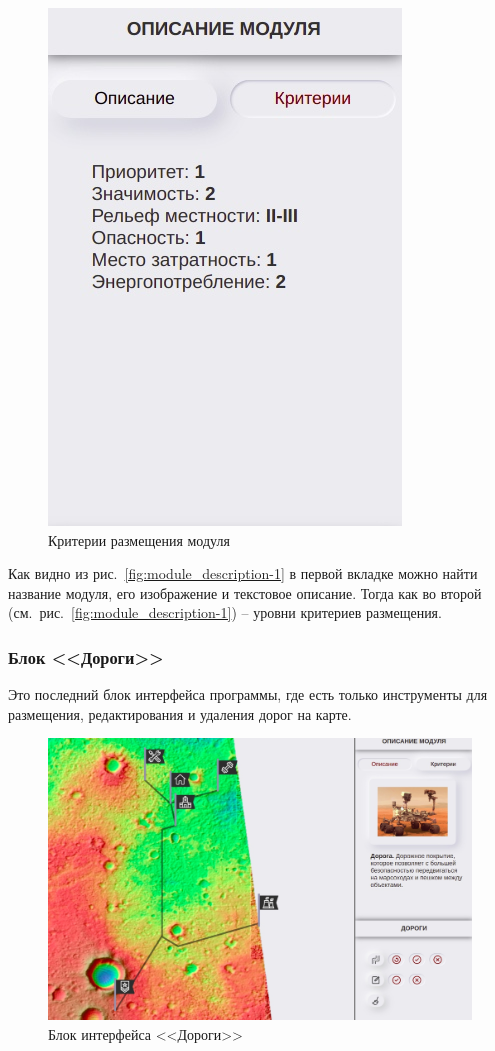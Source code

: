 \begin{figure}[h!]
\begin{minipage}{.48\textwidth}
		\includegraphics[width=.7\linewidth]{./img/module_description-2}
		\caption{Критерии размещения модуля}\label{fig:module_description-2}
	\end{minipage}
\end{figure}

Как видно из рис.~\ref{fig:module_description-1} в первой вкладке можно найти название модуля, его изображение и текстовое описание. Тогда как во второй (см.~рис.~\ref{fig:module_description-1}) -- уровни критериев размещения.



\subsubsection{Блок <<Дороги>>}

Это последний блок интерфейса программы, где есть только инструменты для размещения, редактирования и удаления дорог на карте.

\begin{figure}[h!]
	\centering
	\includegraphics[width=.5\linewidth]{./img/roads}
	\caption{Блок интерфейса <<Дороги>>}\label{fig:roads}
\end{figure}

